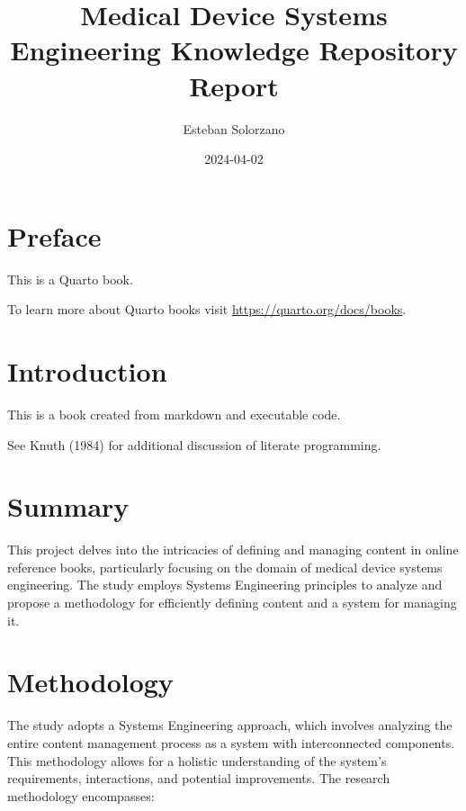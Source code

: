 \documentclass[
  letterpaper,
  DIV=11,
  numbers=noendperiod]{scrreprt}
\title{Medical Device Systems Engineering Knowledge Repository Report}
\author{Esteban Solorzano}
\date{2024-04-02}
\renewcommand*\contentsname{Table of contents}
\newcommand\contentsname{Table of contents}
\begin{document}
\maketitle

\renewcommand*\contentsname{Table of contents}
{
\hypersetup{linkcolor=}
\setcounter{tocdepth}{2}
\tableofcontents
}

\chapter*{Preface}\label{preface}


This is a Quarto book.

To learn more about Quarto books visit
\url{https://quarto.org/docs/books}.


\chapter{Introduction}\label{introduction}

This is a book created from markdown and executable code.

See Knuth (1984) for additional discussion of literate programming.


\chapter{Summary}\label{summary}

This project delves into the intricacies of defining and managing
content in online reference books, particularly focusing on the domain
of medical device systems engineering. The study employs Systems
Engineering principles to analyze and propose a methodology for
efficiently defining content and a system for managing it.


\chapter{Methodology}\label{methodology}

The study adopts a Systems Engineering approach, which involves
analyzing the entire content management process as a system with
interconnected components. This methodology allows for a holistic
understanding of the system's requirements, interactions, and potential
improvements. The research methodology encompasses:
\end{document}
